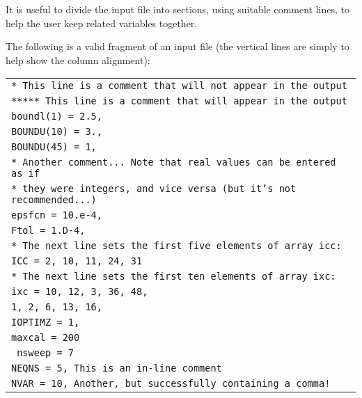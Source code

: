 \documentclass[11pt,a4paper]{report}
\begin{document}
It is useful to divide the input file into sections, using suitable comment
lines, to help the user keep related variables together.

The following is a valid fragment of an input file (the vertical lines are
simply to help show the column alignment):
\begin{center}
\begin{tabular}{||l}
$\!\!$\texttt{* This line is a comment that will not appear in the output} \\
$\!\!$\texttt{***** This line is a comment that will appear in the output} \\
$\!\!$\texttt{boundl(1) = 2.5,} \\
$\!\!$\texttt{BOUNDU(10) = 3.,} \\
$\!\!$\texttt{BOUNDU(45) = 1,} \\
$\!\!$\texttt{* Another comment... Note that real values can be entered as if} \\
$\!\!$\texttt{* they were integers, and vice versa (but it's not recommended...)} \\
$\!\!$\texttt{epsfcn = 10.e-4,} \\
$\!\!$\texttt{Ftol = 1.D-4,} \\
$\!\!$\texttt{* The next line sets the first five elements of array icc:} \\
$\!\!$\texttt{ICC =   2, 10, 11, 24, 31} \\
$\!\!$\texttt{* The next line sets the first ten elements of array ixc:} \\
$\!\!$\texttt{ixc =   10, 12, 3, 36, 48,} \\
$\!\!$\hspace{15mm}\texttt{1, 2, 6, 13, 16,} \\
$\!\!$\texttt{IOPTIMZ = 1,} \\
$\!\!$\texttt{maxcal = 200} \\
$\!\!$\texttt{ nsweep = 7} \\
$\!\!$\texttt{NEQNS = 5,    This is an in-line comment} \\
$\!\!$\texttt{NVAR = 10,    Another, but successfully containing a comma!} \\
\end{tabular}
\end{center}
\end{document}

